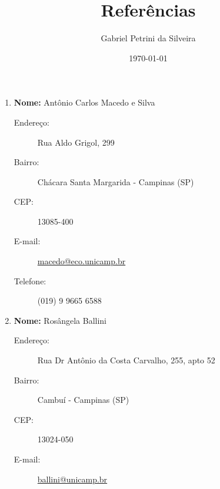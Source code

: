 \documentclass[11pt,a4paper]{article}
\author{Gabriel Petrini da Silveira}
\title{Referências}
\date{\today}
\begin{document}
	\maketitle

\begin{enumerate}
	\item \textbf{Nome:} Antônio Carlos Macedo e Silva
\begin{description}
	\item[Endereço:] Rua Aldo Grigol, 299
	\item[Bairro:] Chácara Santa Margarida - Campinas (SP)
	\item[CEP:] 13085-400
	\item[E-mail:] \url{macedo@eco.unicamp.br}
	\item[Telefone:] (019) 9 9665 6588
\end{description}	

	\item \textbf{Nome:} Rosângela Ballini
\begin{description}
	\item[Endereço:] Rua Dr Antônio da Costa Carvalho, 255, apto 52
	\item[Bairro:] Cambuí - Campinas (SP)
	\item[CEP:] 13024-050
	\item[E-mail:] \url{ballini@unicamp.br}
\end{description}	

\end{enumerate}	
\end{document}
